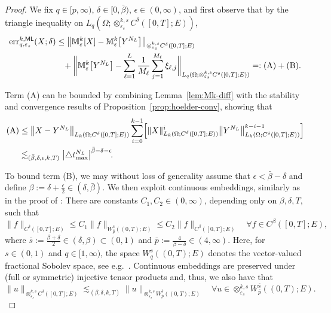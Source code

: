 \documentclass[reqno]{amsart}
\numberwithin{equation}{section}
\newcommand{\bbM}{\mathbb{M}}
\newcommand{\xkseps}{\otimes^{k,s}_{\varepsilon_s}}
\newcommand{\Mk}{\bbM^k_\varepsilon}
\newcommand{\norm}[2]{     \| #1       \|_{ #2 }}
\newcommand{\eps}{\varepsilon}
\theoremstyle{remark}
\theoremstyle{definition}
\begin{document}
\begin{proof} 
	We fix ${q\in[p,\infty)}$, 
	$\delta\in[0, \bar{\beta})$, 
	$\epsilon\in(0,\infty)$,  
	and first observe that by the triangle inequality 
	on $L_q(\Omega;\xkseps C^\delta([0,T];E))$, 
	\begin{align*}
	\mathrm{err}_{q, \eps_s}^{k,\sf ML} (X;\delta) 
	&\leq 
	\bigl\| 
	\Mk[X] 
	- 
	\Mk\bigl[Y^{N_L}\bigr] 
	\bigr\|_{\xkseps C^\delta([0,T];E)} 
	\\
	&\;\;\; +
	\biggl\| 
	\Mk\bigl[Y^{N_L}\bigr] 
	-
	\sum_{\ell = 1}^{L} 
	\frac{1}{M_\ell} 
	\sum_{j=1}^{M_\ell}  
	\xi_{\ell,j}
	\biggr\|_{L_q(\Omega;\xkseps C^\delta([0,T];E))} 
	=:
	\text{(A)} + \text{(B)}. 
	\end{align*} 
	
	Term (A) 
	can be bounded by 
	combining Lemma~\ref{lem:Mk-diff} with 
	the stability and convergence results 
	of Proposition~\ref{prop:hoelder-conv}, 
	showing that 
	\begin{align*} 
	\text{(A)} 
	&\leq 
	\bigl\| X - Y^{N_L} \bigr\|_{L_k(\Omega;C^\delta([0,T];E))} 
	\sum_{i=0}^{k-1} 
	\Bigl[ 
	\norm{X}{L_k(\Omega;C^\delta([0,T];E))}^i 
	\bigl\| Y^{N_L} \bigr\|_{L_k(\Omega;C^\delta([0,T];E))}^{k-i-1} 
	\Bigr]
	\\
	&\lesssim_{(\bar{\beta},\delta,\epsilon,k,T)} 
	\bigl| \triangle t^{N_L}_{\max} \bigr|^{\bar{\beta}-\delta-\epsilon} \!. 
	\end{align*} 
	
	To bound term (B), we may without loss of 
	generality assume that $\epsilon < \bar{\beta} - \delta$ 
	and define 
	$\beta := \delta + \frac{\epsilon}{2} \in (\delta,\bar{\beta})$. 
	We then exploit continuous embeddings, 
	similarly as in the proof of 
	\cite[Corollary~5.15]{CoxEtAl2021}: 
	There are constants 
	$C_1, C_2\in(0,\infty)$, 
	depending only on $\beta,\delta,T$, 
	such that 
	\[ 
	\norm{f}{C^\delta([0,T];E)} 
	\leq 
	C_1 
	\norm{f}{W^{\bar{s}}_{\bar{p}}((0,T);E)} 
	\leq 
	C_2
	\norm{f}{C^\beta([0,T];E)} 
	\quad 
	\forall 
	f \in C^\beta([0,T];E), 
	\]
	where $\bar{s}:= \tfrac{\beta+\delta}{2}
	\in(\delta,\beta)\subset(0,1)$ 
	and 
	$\bar{p} := \tfrac{4}{\beta-\delta}\in(4,\infty)$. 
	Here, for $s\in(0,1)$ and $q\in[1,\infty)$, 
	the space 
	$W^s_q((0,T);E)$ denotes the vector-valued 
	fractional Sobolev space, 
	see 
	e.g.~\cite[Definition~2.5.16]{AnalysisInBanachSpacesI2016}. 
	Continuous embeddings 
	are preserved under (full or symmetric) 
	injective tensor products 
	and, thus, we also have that 
	\[
	\norm{u}{\xkseps C^\delta([0,T];E)} 
	\lesssim_{(\beta,\delta,k,T)}
	\norm{u}{\xkseps W^{\bar{s}}_{\bar{p}}((0,T);E)} 
	\quad 
	\forall 
	u \in \xkseps W^{\bar{s}}_{\bar{p}}((0,T);E). 
	\]
	

\end{proof}
\end{document}
